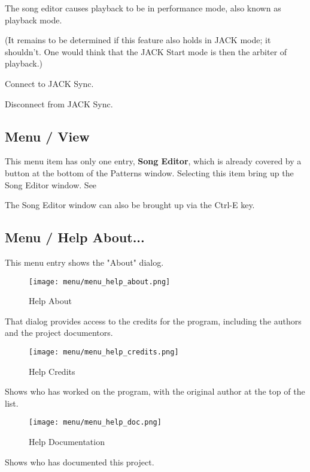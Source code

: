    The song editor causes playback to be in performance mode, also known as
   playback mode.

   (It remains to be determined if this feature also holds in JACK 
   mode; it shouldn't. One would think that the JACK Start mode
   is then the arbiter of playback.)

   Connect to JACK Sync.

   Disconnect from JACK Sync.

\subsection{Menu / View}
\label{subsec:seq64_menu_view}

   This menu item has only one entry, \textbf{Song Editor}, 
   which is already covered by a button at the bottom of the Patterns
   window.  Selecting this item bring up the Song Editor window.
   See 

   The Song Editor window can also be brought up via the
   Ctrl-E key.

\subsection{Menu / Help About...}
\label{subsec:seq64_menu_about}

   This menu entry shows the "About" dialog.

\begin{figure}[H]
   \centering 
   \texttt{[image: menu/menu\_help\_about.png]}
   \caption{Help About}
   \label{fig:seq64_menu_help_about}
\end{figure}

   That dialog provides access to the credits for the program, including the
   authors and the project documentors.

\begin{figure}[H]
   \centering 
   \texttt{[image: menu/menu\_help\_credits.png]}
   \caption{Help Credits}
   \label{fig:seq64_menu_help_credits}
\end{figure}

   Shows who has worked on the program, with the original author at the top
   of the list.

\begin{figure}[H]
   \centering 
   \texttt{[image: menu/menu\_help\_doc.png]}
   \caption{Help Documentation}
   \label{fig:seq64_menu_help_doc}
\end{figure}

   Shows who has documented this project.

